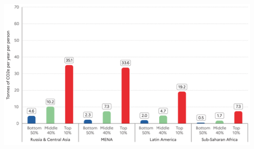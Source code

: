 \begin{frame}
\begin{scriptsize}
\begin{columns}
      \begin{center}
        \includegraphics[width=1.0\textwidth]{plots/WIR_carbon_per_capita_rest.png}
      \end{center}      
    \end{columns}

  \end{scriptsize}
  \end{frame}
